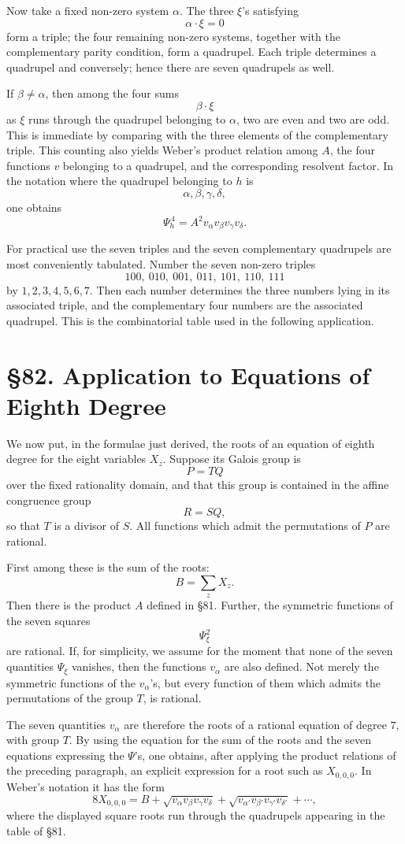 \documentclass[11pt,a4paper]{book}
\newcommand{\webersection}[2]{\clearpage\section*{\S #1. #2}}
\begin{document}
Now take a fixed non-zero system \(\alpha\).  The three \(\xi\)'s satisfying
\[
 \alpha\cdot\xi=0
\]
form a triple; the four remaining non-zero systems, together with the complementary parity condition, form a quadrupel.  Each triple determines a quadrupel and conversely; hence there are seven quadrupels as well.

If \(\beta\ne\alpha\), then among the four sums
\[
 \beta\cdot\xi
\]
as \(\xi\) runs through the quadrupel belonging to \(\alpha\), two are even and two are odd.  This is immediate by comparing with the three elements of the complementary triple.  This counting also yields Weber's product relation among \(A\), the four functions \(v\) belonging to a quadrupel, and the corresponding resolvent factor.  In the notation where the quadrupel belonging to \(h\) is
\[
 \alpha,\beta,\gamma,\delta,
\]
one obtains
\[
 \Psi_h^{\,4}=A^2v_\alpha v_\beta v_\gamma v_\delta .
\]

For practical use the seven triples and the seven complementary quadrupels are most conveniently tabulated.  Number the seven non-zero triples
\[
 100,\ 010,\ 001,\ 011,\ 101,\ 110,\ 111
\]
by \(1,2,3,4,5,6,7\).  Then each number determines the three numbers lying in its associated triple, and the complementary four numbers are the associated quadrupel.  This is the combinatorial table used in the following application.

\webersection{82}{Application to Equations of Eighth Degree}

We now put, in the formulae just derived, the roots of an equation of eighth degree for the eight variables \(X_z\).  Suppose its Galois group is
\[
 P=TQ
\]
over the fixed rationality domain, and that this group is contained in the affine congruence group
\[
 R=SQ,
\]
so that \(T\) is a divisor of \(S\).  All functions which admit the permutations of \(P\) are rational.

First among these is the sum of the roots:
\[
 B=\sum_z X_z.
\]
Then there is the product \(A\) defined in \S 81.  Further, the symmetric functions of the seven squares
\[
 \Psi_\xi^2
\]
are rational.  If, for simplicity, we assume for the moment that none of the seven quantities \(\Psi_\xi\) vanishes, then the functions \(v_\alpha\) are also defined.  Not merely the symmetric functions of the \(v_\alpha\)'s, but every function of them which admits the permutations of the group \(T\), is rational.

The seven quantities \(v_\alpha\) are therefore the roots of a rational equation of degree \(7\), with group \(T\).  By using the equation for the sum of the roots and the seven equations expressing the \(\Psi\)'s, one obtains, after applying the product relations of the preceding paragraph, an explicit expression for a root such as \(X_{0,0,0}\).  In Weber's notation it has the form
\[
 8X_{0,0,0}
  =B+\sqrt{v_\alpha v_\beta v_\gamma v_\delta}
      +\sqrt{v_{\alpha'}v_{\beta'}v_{\gamma'}v_{\delta'}}
      +\cdots ,
\]
where the displayed square roots run through the quadrupels appearing in the table of \S 81.
\end{document}
